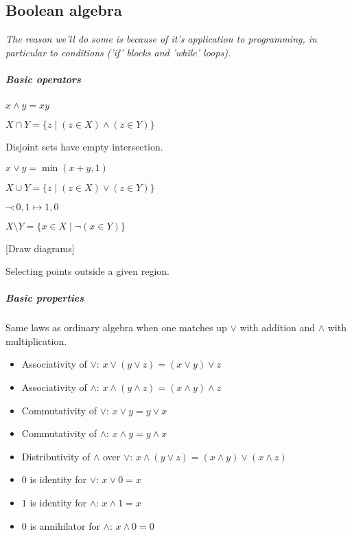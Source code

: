 \subsection{Boolean algebra}
\textit{The reason we'll do some is because of it's application to programming, in particular to conditions ('if' blocks and 'while' loops).}
\subparagraph{Basic operators}
\begin{definition}[Conjunction]
    $x \land y = xy$
\end{definition}
\begin{definition}[Intersection]
    $X \cap Y = \{ z \mid (z \in X) \land (z \in Y) \}$
\end{definition}
\begin{remark}
    Disjoint sets have empty intersection.
\end{remark}
\begin{definition}[Disjunction]
    $x \lor y = \min(x+y,1)$
\end{definition}
\begin{definition}[Union]
    $X \cup Y = \{ z \mid (z \in X) \lor (z \in Y) \}$
\end{definition}
\begin{definition}[Negation]
    $\lnot: 0,1 \mapsto 1,0$
\end{definition}
\begin{definition}
    $X \setminus Y = \{ x \in X \mid \lnot (x \in Y) \}$
\end{definition}
[Draw diagrams]
\begin{question}
    Selecting points outside a given region.
\end{question}
\subparagraph{Basic properties}
\begin{property}
    Same laws as ordinary algebra when one matches up $\lor$ with addition and $\land$ with multiplication.
    \begin{itemize}
        \item Associativity of $\lor$: $x \lor (y \lor z) = (x \lor y) \lor z$
        \item Associativity of $\land$: $x \land (y \land z) = (x \land y) \land z$
        \item Commutativity of $\lor$: $x \lor y  = y \lor x$
        \item Commutativity of $\land$: $x \land y  = y \land x$
        \item Distributivity of $\land$ over $\lor$:  $x \land (y \lor z) = (x \land y) \lor (x \land z)$
        \item $0$ is identity for $\lor$: $x \lor 0  = x$
        \item $1$ is identity for $\land$: $x \land 1  = x$
        \item $0$ is annihilator for $\land$: $x \land 0  = 0$
    \end{itemize}
\end{property}
